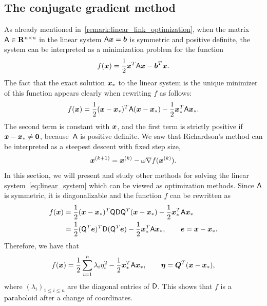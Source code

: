 \subsection{The conjugate gradient method}%
\label{sub:the_conjugate_gradient_method}

As already mentioned in~\cref{remark:linear_link_optimization},
when the matrix $\mathsf A \in \mathbf R^{n \times n}$ in the linear system $\mathsf A \mathbf{\boldsymbol{x}} = \mathbf{\boldsymbol{b}}$ is symmetric and positive definite,
the system can be interpreted as a minimization problem for the function
\begin{equation}
    \label{eq:function_optimization}
    f(\mathbf{\boldsymbol{x}}) = \frac{1}{2} \mathbf{\boldsymbol{x}}^T \mathsf A \mathbf{\boldsymbol{x}} - \mathbf{\boldsymbol{b}}^T \mathbf{\boldsymbol{x}}.
\end{equation}
The fact that
the exact solution $\mathbf{\boldsymbol{x}}_*$ to the linear system is the unique minimizer of this function appears clearly
when rewriting $f$ as follows:
\begin{equation}
    \label{eq:rewritten_expression_of_f}
    f(\mathbf{\boldsymbol{x}})
    = \frac{1}{2} (\mathbf{\boldsymbol{x}} - \mathbf{\boldsymbol{x}}_*)^T \mathsf A (\mathbf{\boldsymbol{x}} - \mathbf{\boldsymbol{x}}_*)  - \frac{1}{2} \mathbf{\boldsymbol{x}}_*^T \mathsf A \mathbf{\boldsymbol{x}}_{*}.
\end{equation}
The second term is constant with $\mathbf{\boldsymbol{x}}$,
and the first term is strictly positive if $\mathbf{\boldsymbol{x}} - \mathbf{\boldsymbol{x}}_* \neq \mathbf{\boldsymbol{0}}$,
because~$\mathsf A$ is positive definite.
We saw that Richardson's method can be interpreted as a steepest descent with fixed step size,
\[
    \mathbf{\boldsymbol{x}}^{(k+1)} = \mathbf{\boldsymbol{x}}^{(k)} - \omega \nabla f(\mathbf{\boldsymbol{x}}^{(k)}).
\]
In this section,
we will present and study other methods
for solving the linear system~\eqref{eq:linear_system}
which can be viewed as optimization methods.
Since $\mathsf A$ is symmetric,
it is diagonalizable and the function $f$ can be rewritten as
\begin{align*}
    f(\mathbf{\boldsymbol{x}})
    &= \frac{1}{2} (\mathbf{\boldsymbol{x}} - \mathbf{\boldsymbol{x}}_*)^T \mathsf Q \mathsf D \mathsf Q^T (\mathbf{\boldsymbol{x}} - \mathbf{\boldsymbol{x}}_*)  - \frac{1}{2} \mathbf{\boldsymbol{x}}_*^T \mathsf A \mathbf{\boldsymbol{x}}_{*} \\
    &= \frac{1}{2} (\mathsf Q^T \mathbf{\boldsymbol{e}})^T \mathsf D (\mathsf Q^T \mathbf{\boldsymbol{e}})  - \frac{1}{2} \mathbf{\boldsymbol{x}}_*^T \mathsf A \mathbf{\boldsymbol{x}}_{*}, \qquad  \mathbf{\boldsymbol{e}} = \mathbf{\boldsymbol{x}} - \mathbf{\boldsymbol{x}}_*.
\end{align*}
Therefore, we have that
\begin{align*}
    f(\mathbf{\boldsymbol{x}})= \frac{1}{2} \sum_{i=1}^{n} \lambda_i \eta_i^2 - \frac{1}{2} \mathbf{\boldsymbol{x}}_*^T \mathsf A \mathbf{\boldsymbol{x}}_{*}, \qquad  \mathbf{\boldsymbol{\eta}} = \mathbf{\boldsymbol{Q}}^T (\mathbf{\boldsymbol{x}} - \mathbf{\boldsymbol{x}}_*),
\end{align*}
where $(\lambda_i)_{1 \leq i \leq n}$ are the diagonal entries of $\mathsf D$.
This shows that $f$ is a paraboloid
after a change of coordinates.

